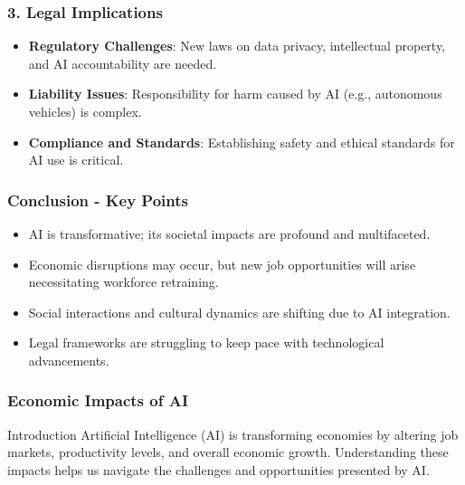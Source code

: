 \documentclass[aspectratio=169]{beamer}
\begin{document}
\begin{frame}[fragile]
    \frametitle{3. Legal Implications}
    \begin{itemize}
        \item \textbf{Regulatory Challenges}: New laws on data privacy, intellectual property, and AI accountability are needed.
        \item \textbf{Liability Issues}: Responsibility for harm caused by AI (e.g., autonomous vehicles) is complex.
        \item \textbf{Compliance and Standards}: Establishing safety and ethical standards for AI use is critical.
    \end{itemize}
\end{frame}

\begin{frame}[fragile]
    \frametitle{Conclusion - Key Points}
    \begin{itemize}
        \item AI is transformative; its societal impacts are profound and multifaceted.
        \item Economic disruptions may occur, but new job opportunities will arise necessitating workforce retraining.
        \item Social interactions and cultural dynamics are shifting due to AI integration.
        \item Legal frameworks are struggling to keep pace with technological advancements.
    \end{itemize}
\end{frame}

\begin{frame}[fragile]
    \frametitle{Economic Impacts of AI}
    \begin{block}{Introduction}
        Artificial Intelligence (AI) is transforming economies by altering job markets, productivity levels, and overall economic growth. Understanding these impacts helps us navigate the challenges and opportunities presented by AI.
    \end{block}
\end{frame}
\end{document}
